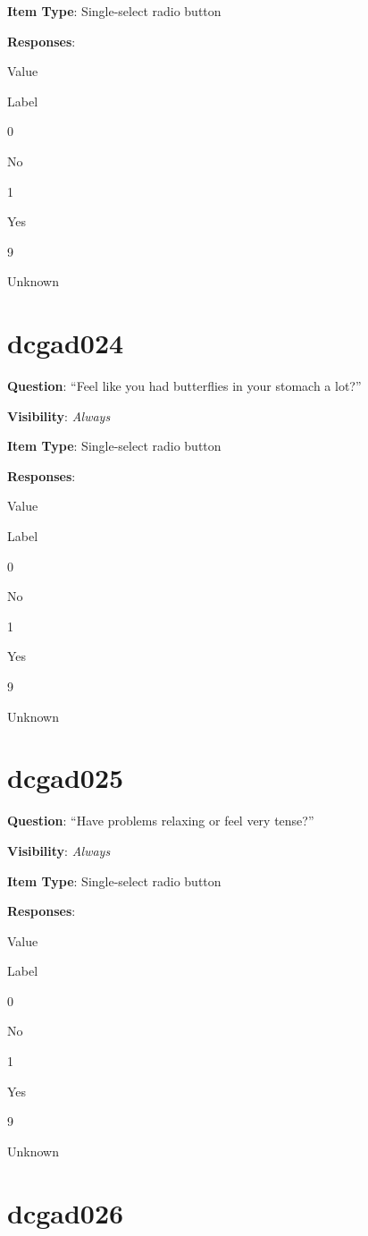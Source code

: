 \documentclass[]{book}
\begin{document}
\textbf{Item Type}: Single-select radio button

\textbf{Responses}:

Value

Label

0

No

1

Yes

9

Unknown

\hypertarget{dcgad024}{%
\section{dcgad024}\label{dcgad024}}

\textbf{Question}: ``Feel like you had butterflies in your stomach a lot?''

\textbf{Visibility}: \emph{Always}

\textbf{Item Type}: Single-select radio button

\textbf{Responses}:

Value

Label

0

No

1

Yes

9

Unknown

\hypertarget{dcgad025}{%
\section{dcgad025}\label{dcgad025}}

\textbf{Question}: ``Have problems relaxing or feel very tense?''

\textbf{Visibility}: \emph{Always}

\textbf{Item Type}: Single-select radio button

\textbf{Responses}:

Value

Label

0

No

1

Yes

9

Unknown

\hypertarget{dcgad026}{%
\section{dcgad026}\label{dcgad026}}
\end{document}
